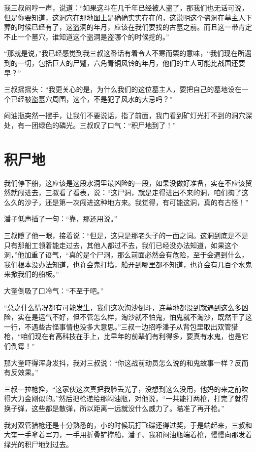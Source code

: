 我三叔闷哼一声，说道：“如果这斗在几千年已经被人盗了，那我们也无话可说，但是你要知道，这洞穴在那地图上是确确实实存在的，这说明这个盗洞在墓主人下葬的时候已经有了，这盗洞的年月，应该在我们要找的古墓之前。而且这一带肯定不止一个墓穴，谁知道这个盗洞是盗哪个的时候挖的。”

“那就是说，”我已经感觉到我三叔这番话有着令人不寒而栗的意味，“我们现在所遇到的一切，包括巨大的尸蹩，六角青铜风铃的年月，他们的主人可能比战国还要早？”

三叔摇摇头：“我更关心的是，为什么我们的这位墓主人，要把自己的墓地设在一个已经被盗墓穴周围，这个，不是犯了风水的大忌吗？”

闷油瓶突然一摆手，让我们不要说话，指了前面，我门看到矿灯光打不到的洞穴深处，有一团绿色的磷光。三叔叹了口气：“积尸地到了！”

\chapter{积尸地}

我们停下船，这应该是这段水洞里最凶险的一段，如果没做好准备，实在不应该贸然就闯进去，三叔看了看表，说：“这尸洞，就是走得进出不来的洞，咱们掏了这么久的沙子，还是第一次闯进这种地方来。我觉得，有可能这洞，真的有古怪！”

潘子低声插了一句：“靠，那还用说。”

三叔瞪了他一眼，接着说：“但是，这只是那老头子的一面之词。这洞到底是不是只有那船工领着能走过去，其他人都过不去，我们已经没办法知道，如果这个洞，”他加重了语气，“真的是个尸洞，那么前面必然会有危险，至于会遇到什么，我们根本没办法知道，也许会鬼打墙，船开到哪里都不知道，也许会有几百个水鬼来掀我们的船板。”

大奎倒吸了口冷气：“不至于吧。”

“总之什么情况都有可能发生，我们这次淘沙倒斗，连墓地都没到就遇到这么多凶险，实在是运气不好，但不管怎么样，淘沙就不怕鬼，怕鬼就不淘沙，既然干了这一行，不遇些古怪事情也没多大意思。”三叔一边招呼潘子从背包里取出双管猎枪，“咱们现在有高科技在手上，比早年的前辈们有利得多，要真有水鬼，也是它们倒霉！”

那大奎吓得浑身发抖，我对三叔说：“你这战前动员怎么说的和鬼故事一样？反而有反效果。”

三叔一拉枪拴，“这家伙这次真把我脸丢光了，没想到这么没用，他妈的来之前吹得大力金刚似的。”然后把枪递给那闷油瓶，对他说，“一共能打两枪，打完了就得换子弹，这些都是散弹，所以距离一远就没什么威力了。瞄准了再开枪。”

我对双管猎枪还是十分熟悉的，小的时候玩打飞碟还得过奖，于是端起来，三叔和大奎一手拿着军刀，一手用折叠铲撑船，潘子、我和闷油瓶端着枪，慢慢向那发着绿光的积尸地划过去。

